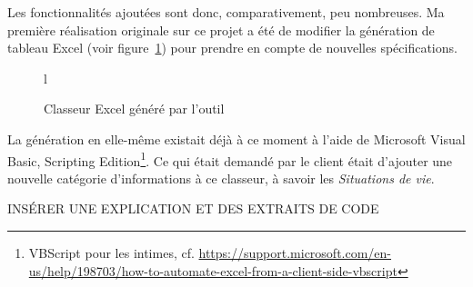 Les fonctionnalités ajoutées sont donc, comparativement, peu nombreuses. Ma première réalisation originale sur ce projet a été de modifier la génération de tableau Excel (voir figure~\ref{fig:classeur}) pour prendre en compte de nouvelles spécifications.

\begin{figure}{l}
	\caption{Classeur Excel généré par l'outil}
	\label{fig:classeur}
\end{figure}

La génération en elle-même existait déjà à ce moment à l'aide de Microsoft Visual Basic, Scripting Edition\footnote{VBScript pour les intimes, cf. \url{https://support.microsoft.com/en-us/help/198703/how-to-automate-excel-from-a-client-side-vbscript}}. Ce qui était demandé par le client était d'ajouter une nouvelle catégorie d'informations à ce classeur, à savoir les \emph{Situations de vie}.

INSÉRER UNE EXPLICATION ET DES EXTRAITS DE CODE